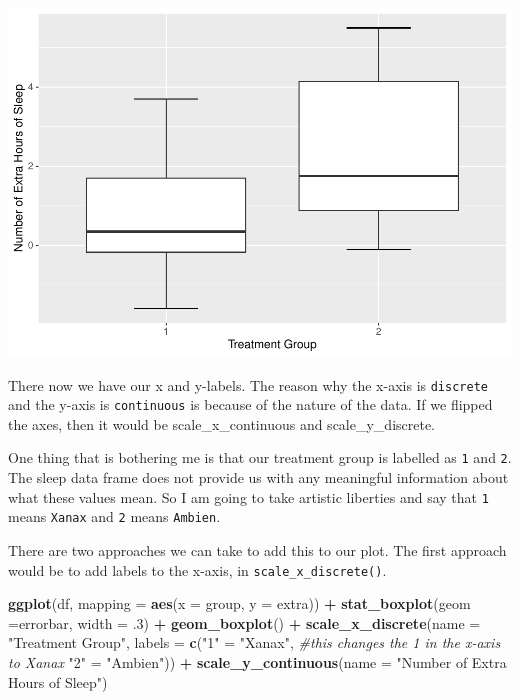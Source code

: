 \documentclass[
]{book}
\newenvironment{Shaded}{\begin{snugshade}}{\end{snugshade}}
\newcommand{\AttributeTok}[1]{\textcolor[rgb]{0.13,0.29,0.53}{#1}}
\newcommand{\CommentTok}[1]{\textcolor[rgb]{0.56,0.35,0.01}{\textit{#1}}}
\newcommand{\DecValTok}[1]{\textcolor[rgb]{0.00,0.00,0.81}{#1}}
\newcommand{\FunctionTok}[1]{\textcolor[rgb]{0.13,0.29,0.53}{\textbf{#1}}}
\newcommand{\NormalTok}[1]{#1}
\newcommand{\OtherTok}[1]{\textcolor[rgb]{0.56,0.35,0.01}{#1}}
\newcommand{\SpecialCharTok}[1]{\textcolor[rgb]{0.81,0.36,0.00}{\textbf{#1}}}
\newcommand{\StringTok}[1]{\textcolor[rgb]{0.31,0.60,0.02}{#1}}
\begin{document}
\includegraphics{rintro_demo_files/figure-latex/unnamed-chunk-283-1.pdf}

There now we have our x and y-labels. The reason why the x-axis is \texttt{discrete} and the y-axis is \texttt{continuous} is because of the nature of the data. If we flipped the axes, then it would be scale\_x\_continuous and scale\_y\_discrete.

One thing that is bothering me is that our treatment group is labelled as \texttt{1} and \texttt{2}. The sleep data frame does not provide us with any meaningful information about what these values mean. So I am going to take artistic liberties and say that \texttt{1} means \texttt{Xanax} and \texttt{2} means \texttt{Ambien}.

There are two approaches we can take to add this to our plot. The first approach would be to add labels to the x-axis, in \texttt{scale\_x\_discrete()}.

\begin{Shaded}
\begin{Highlighting}[]
\FunctionTok{ggplot}\NormalTok{(df, }\AttributeTok{mapping =} \FunctionTok{aes}\NormalTok{(}\AttributeTok{x =}\NormalTok{ group, }\AttributeTok{y =}\NormalTok{ extra)) }\SpecialCharTok{+}
  \FunctionTok{stat\_boxplot}\NormalTok{(}\AttributeTok{geom =}\StringTok{\textquotesingle{}errorbar\textquotesingle{}}\NormalTok{, }\AttributeTok{width =}\NormalTok{ .}\DecValTok{3}\NormalTok{) }\SpecialCharTok{+}
  \FunctionTok{geom\_boxplot}\NormalTok{() }\SpecialCharTok{+} 
  \FunctionTok{scale\_x\_discrete}\NormalTok{(}\AttributeTok{name =} \StringTok{"Treatment Group"}\NormalTok{,}
                   \AttributeTok{labels =} \FunctionTok{c}\NormalTok{(}\StringTok{"1"}  \OtherTok{=} \StringTok{"Xanax"}\NormalTok{, }\CommentTok{\#this changes the 1 in the x{-}axis to Xanax}
                              \StringTok{"2"} \OtherTok{=} \StringTok{"Ambien"}\NormalTok{)) }\SpecialCharTok{+} 
  \FunctionTok{scale\_y\_continuous}\NormalTok{(}\AttributeTok{name =} \StringTok{"Number of Extra Hours of Sleep"}\NormalTok{)}
\end{Highlighting}
\end{Shaded}
\end{document}
